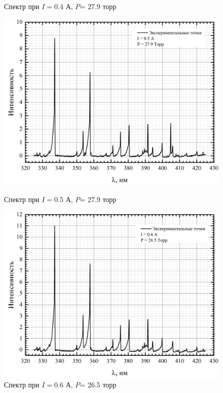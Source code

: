\begin{figure}[H]
\begin{minipage}[H]{0.45\linewidth}
		\caption{Спектр при $I= 0.4 $ А, $P$= 27.9 торр}
		\label{full_04_279}
	\end{minipage}
	\begin{minipage}{0.45\linewidth}
		\centering
		\includegraphics[width=\linewidth]{full_05_279}
		\caption{Спектр при $I= 0.5 $ А, $P$= 27.9 торр}
		\label{full_05_279}	
	\end{minipage} 
	\hfill
	\begin{minipage}[H]{0.45\linewidth}
		\centering
		\includegraphics[width=\linewidth]{full_06_265}
		\caption{Спектр при $I= 0.6 $ А, $P$= 26.5 торр}
		\label{full_06_265}
	\end{minipage}
	\begin{minipage}{0.45\linewidth}

\end{minipage}
\end{figure}
